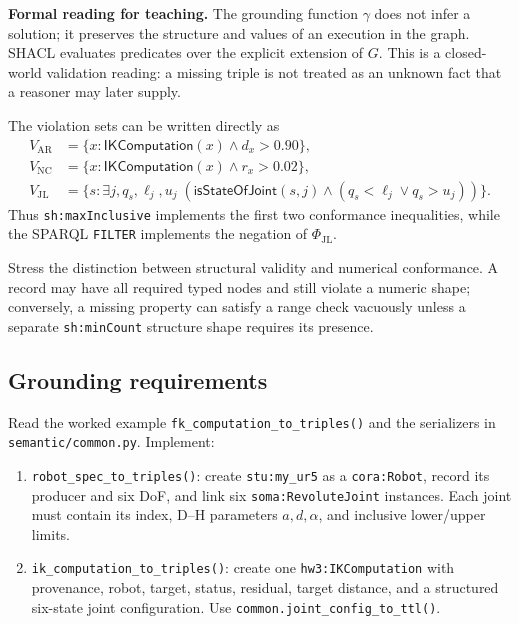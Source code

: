 \documentclass[11pt]{article}
\newcommand{\code}[1]{\nolinkurl{#1}}
\begin{document}
\begin{tutornote}
\textbf{Formal reading for teaching.} The grounding function \(\gamma\) does
not infer a solution; it preserves the structure and values of an execution in
the graph. SHACL evaluates predicates over the explicit extension of \(G\).
This is a closed-world validation reading: a missing triple is not treated as
an unknown fact that a reasoner may later supply.

The violation sets can be written directly as
\begin{align*}
V_{\mathrm{AR}}&=\{x:\mathsf{IKComputation}(x)\wedge d_x>0.90\},\\
V_{\mathrm{NC}}&=\{x:\mathsf{IKComputation}(x)\wedge r_x>0.02\},\\
V_{\mathrm{JL}}&=\{s:\exists j,q_s,\ell_j,u_j\;
  (\mathsf{isStateOfJoint}(s,j)\wedge(q_s<\ell_j\vee q_s>u_j))\}.
\end{align*}
Thus \code{sh:maxInclusive} implements the first two conformance inequalities,
while the SPARQL \code{FILTER} implements the negation of
\(\Phi_{\mathrm{JL}}\).

Stress the distinction between structural validity and numerical conformance.
A record may have all required typed nodes and still violate a numeric shape;
conversely, a missing property can satisfy a range check vacuously unless a
separate \code{sh:minCount} structure shape requires its presence.
\end{tutornote}

\subsection{Grounding requirements}

Read the worked example \code{fk_computation_to_triples()} and the serializers
in \code{semantic/common.py}. Implement:
\begin{enumerate}
  \item \code{robot_spec_to_triples()}: create \code{stu:my_ur5} as a
    \code{cora:Robot}, record its producer and six DoF, and link six
    \code{soma:RevoluteJoint} instances. Each joint must contain its index,
    D--H parameters $a,d,\alpha$, and inclusive lower/upper limits.
  \item \code{ik_computation_to_triples()}: create one
    \code{hw3:IKComputation} with provenance, robot, target, status, residual,
    target distance, and a structured six-state joint configuration. Use
    \code{common.joint_config_to_ttl()}.
\end{enumerate}
\end{document}

